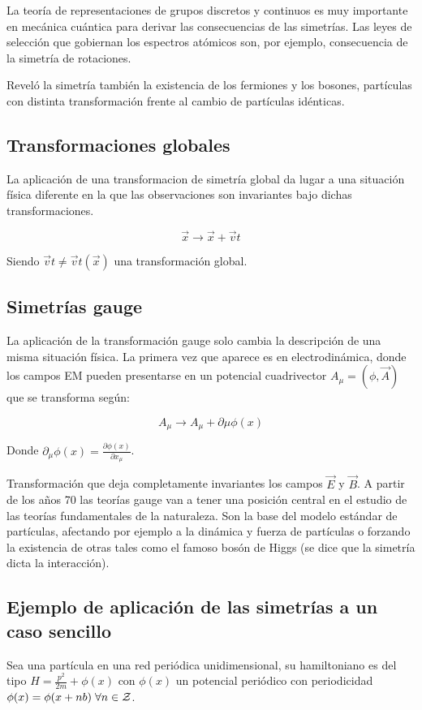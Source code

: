 \documentclass{article}
\begin{document}
La teoría de representaciones de grupos discretos y continuos es muy importante en mecánica cuántica para derivar las consecuencias de las simetrías. Las leyes de selección que gobiernan los espectros atómicos son, por ejemplo, consecuencia de la simetría de rotaciones.

Reveló la simetría también la existencia de los fermiones y los bosones, partículas con distinta transformación frente al cambio de partículas idénticas.

\subsection{Transformaciones globales}
La aplicación de una transformacion de simetría global da lugar a una situación física diferente en la que las observaciones son invariantes bajo dichas transformaciones.

$$\Vec{x}\longrightarrow \Vec{x}+\Vec{v}t$$

Siendo $\Vec{v}t\neq \Vec{v}t(\Vec{x})$ una transformación global.


\subsection{Simetrías gauge}
La aplicación de la transformación gauge solo cambia la descripción de una misma situación física. La primera vez que aparece es en electrodinámica, donde los campos EM pueden presentarse en un potencial cuadrivector $A_\mu=(\phi, \Vec{A})$ que se transforma según:

$$A_\mu \longrightarrow A_\mu +\partial \mu \phi (x)$$

Donde $\partial _\mu \phi (x)=\frac{\partial \phi (x)}{\partial x_\mu}$. 

Transformación que deja completamente invariantes los campos $\Vec{E}$ y $\Vec{B}$. A partir de los años 70 las teorías gauge van a tener una posición central en el estudio de las teorías fundamentales de la naturaleza. Son la base del modelo estándar de partículas, afectando por ejemplo a la dinámica y fuerza de partículas o forzando la existencia de otras tales como el famoso bosón de Higgs (se dice que la simetría dicta la interacción).

\newpage
\subsection{Ejemplo de aplicación de las simetrías a un caso sencillo}

Sea una partícula en una red periódica unidimensional, su hamiltoniano es del tipo $H=\frac{p^2}{2m}+\phi (x)$ con $\phi (x)$ un potencial periódico con periodicidad $\phi (x)=\phi (x+nb) \hspace{0.1cm} \forall n\in \mathcal{Z}$.
\end{document}
